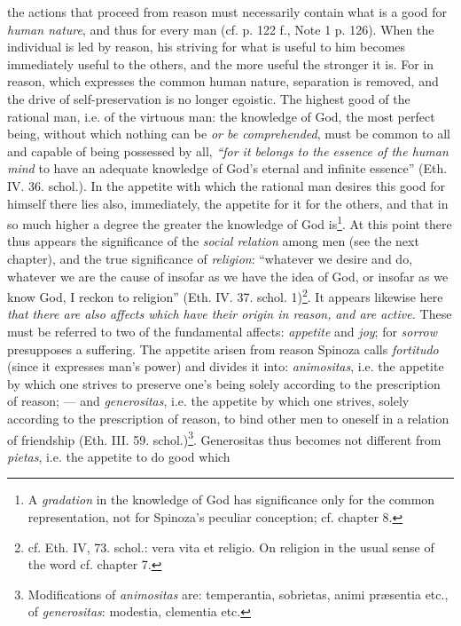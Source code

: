 \documentclass[12pt,a4paper,openany]{book}
\newcommand{\opage}[1]{\marginnote{\footnotesize\textit{[#1]}}}
\begin{document}
the actions that proceed from reason must necessarily
contain what is a good for \emph{human
nature}, and thus for every man (cf. p. 122 f., Note 1
p. 126). When the individual is led by reason, his striving
for what is useful to him becomes immediately useful to the others,
and the more useful the stronger it is. For in reason, which
expresses the common human nature, separation is
removed, and the drive of self-preservation is no longer
egoistic. The highest good of the rational man, i.e. of the virtuous man:
the knowledge of God, the most perfect being, without which
nothing can be \emph{or be comprehended}, must be common to all
and capable of being possessed by all, \emph{``for it belongs to the
essence of the human mind} to have an adequate
knowledge of God's eternal and infinite essence'' (Eth. IV. 36.
schol.). In the appetite with which the rational man desires
this good for himself there lies also, immediately, the appetite
for it for the others, and that in so much higher a degree the greater
the knowledge of God is\footnote{A \emph{gradation} in the knowledge of God has significance only for the
common representation, not for Spinoza's peculiar conception;
cf. chapter 8.}. At this point there thus appears
the significance of the \emph{social relation} among men
(see the next chapter), and the true significance of \emph{religion}:
``whatever we desire and do, whatever we are the cause of
insofar as we have the idea of God, or insofar as we know
God, I reckon to religion'' (Eth. IV. 37. schol. 1)\footnote{cf. Eth. IV, 73. schol.: vera vita et religio. On religion in the
usual sense of the word cf. chapter 7.}.
It appears likewise here \emph{that there are also affects
which have their origin in reason,}
\opage{128}\setcounter{footnote}{0}\emph{and are active.} These must be referred to two of the fundamental
affects: \emph{appetite} and \emph{joy}; for \emph{sorrow} presupposes a
suffering. The appetite arisen from reason Spinoza calls
\emph{fortitudo} (since it expresses man's power) and divides
it into: \emph{animositas}, i.e. the appetite by which one
strives to preserve one's being solely according to the prescription
of reason; --- and \emph{generositas}, i.e. the appetite by which
one strives, solely according to the prescription of reason, to
bind other men to oneself in a relation of friendship
(Eth. III. 59. schol.)\footnote{Modifications of \emph{animositas} are: temperantia, sobrietas, animi
præsentia etc., of \emph{generositas}: modestia, clementia etc.}. Generositas thus becomes not
different from \emph{pietas}, i.e. the appetite to do good which
\end{document}
